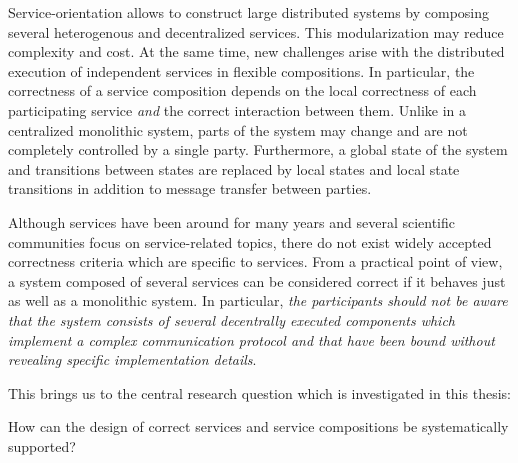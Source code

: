 Service-orientation allows to construct large distributed systems by composing several heterogenous and decentralized services. This modularization may reduce complexity and cost. At the same time, new challenges arise with the distributed execution of independent services in flexible compositions. In particular, the correctness of a service composition depends on the local correctness of each participating service \emph{and} the correct interaction between them. Unlike in a centralized monolithic system, parts of the system may change and are not completely controlled by a single party. Furthermore, a global state of the system and transitions between states are replaced by local states and local state transitions in addition to message transfer between parties.

Although services have been around for many years and several scientific communities focus on service-related topics, there do not exist widely accepted correctness criteria which are specific to services. From a practical point of view, a system composed of several services can be considered correct if it behaves just as well as a monolithic system. In particular, \emph{the participants should not be aware that the system consists of several decentrally executed components which implement a complex communication protocol and that have been bound without revealing specific implementation details}.

This brings us to the central research question which is investigated in this thesis:

\begin{framed}
\noindent How can the design of correct services and service compositions be systematically supported?
\end{framed}

